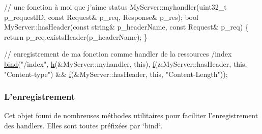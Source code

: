 \begin{DoxyCode}
\textcolor{comment}{// une fonction à moi que j'aime}
status MyServer::myhandler(uint32\_t p\_requestID, \textcolor{keyword}{const} Request& p\_req, Response& p\_res);
\textcolor{keywordtype}{bool}  MyServer::hasHeader(\textcolor{keyword}{const} \textcolor{keywordtype}{string}& p\_headerName, \textcolor{keyword}{const} Request& p\_req)
\{
  \textcolor{keywordflow}{return} p\_req.existsHeader(p\_headerName);
\}

\textcolor{comment}{// enregistrement de ma fonction comme handler de la ressources /index}
\hyperlink{classxtd_1_1network_1_1http_1_1Server_a7281ae7cdda6d7b2334b27e530ce000f}{bind}(\textcolor{stringliteral}{"/index"},
     \hyperlink{classxtd_1_1network_1_1http_1_1Server_adfa2951649119f630d33ce9083bd989c}{h}(&MyServer::myhandler, \textcolor{keyword}{this}),
     \hyperlink{classxtd_1_1network_1_1http_1_1Server_a49f38021cb4d61f2c3027785f8fa561c}{f}(&MyServer::hasHeader, \textcolor{keyword}{this}, \textcolor{stringliteral}{"Content-type"}) &&
     \hyperlink{classxtd_1_1network_1_1http_1_1Server_a49f38021cb4d61f2c3027785f8fa561c}{f}(&MyServer::hasHeader, \textcolor{keyword}{this}, \textcolor{stringliteral}{"Content-Length"}));
\end{DoxyCode}


\par
 \subsubsection*{L'enregistrement }

Cet objet founi de nombreuses méthodes utilitaires pour faciliter l'enregistrement des handlers. Elles sont toutes préfixées par \char`\"{}bind\char`\"{}.



